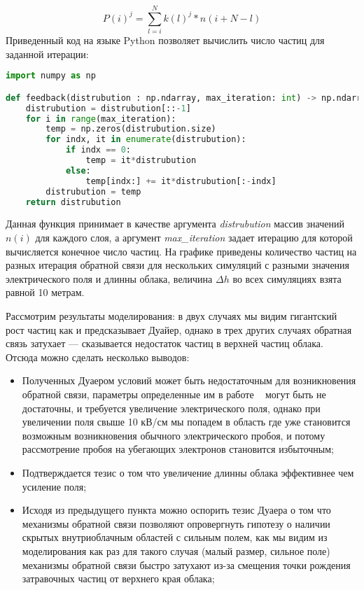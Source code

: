 \begin{equation}
P(i)^{j} = \sum_{l=i}^{N} k(l)^j * n(i+N-l)
\end{equation}
Приведенный код на языке Python позволяет вычислить число частиц для заданной итерации:
\begin{lstlisting}[language=Python]
import numpy as np

def feedback(distrubution : np.ndarray, max_iteration: int) -> np.ndarray:
    distrubution = distrubution[::-1]
    for i in range(max_iteration):
        temp = np.zeros(distrubution.size)
        for indx, it in enumerate(distrubution):
            if indx == 0:
                temp = it*distrubution
            else:
                temp[indx:] += it*distrubution[:-indx]
        distrubution = temp
    return distrubution
\end{lstlisting}
Данная функция принимает в качестве аргумента \textit{distrubution} массив значений $n(i)$ для каждого слоя, а аргумент \textit{max\_iteration} задает итерацию для которой вычисляется конечное число частиц. На графике приведены количество частиц на разных итерация обратной связи для нескольких симуляций с разными значения электрического поля и длинны облака, величина $\Delta h$ во всех симуляциях взята равной 10 метрам. 

Рассмотрим результаты моделирования: в двух случаях мы видим гигантский рост частиц как и предсказывает Дуайер, однако в трех других случаях обратная связь затухает --- сказывается недостаток частиц в верхней частиц облака. Отсюда можно сделать несколько выводов: 
\begin{itemize}
    \item Полученных Дуаером условий может быть недостаточным для возникновения обратной связи, параметры определенные им в работе ~\cite{dwyer2003fundamental} могут быть не достаточны, и требуется увеличение электрического поля, однако при увеличении поля свыше 10 кВ/см мы попадем в область где уже становится возможным возникновения обычного электрического пробоя, и потому рассмотрение пробоя на убегающих электронов становится избыточным;
    \item Подтверждается тезис о том что увеличение длинны облака эффективнее чем усиление поля;
    \item Исходя из предыдущего пункта можно оспорить тезис Дуаера о том что механизмы обратной связи позволяют опровергнуть гипотезу о наличии скрытых внутриоблачным областей с сильным полем, как мы видим из моделирования как раз для такого случая (малый размер, сильное поле) механизмы обратной связи быстро затухают из-за смещения точки рождения затравочных частиц от верхнего края облака;
\end{itemize}

